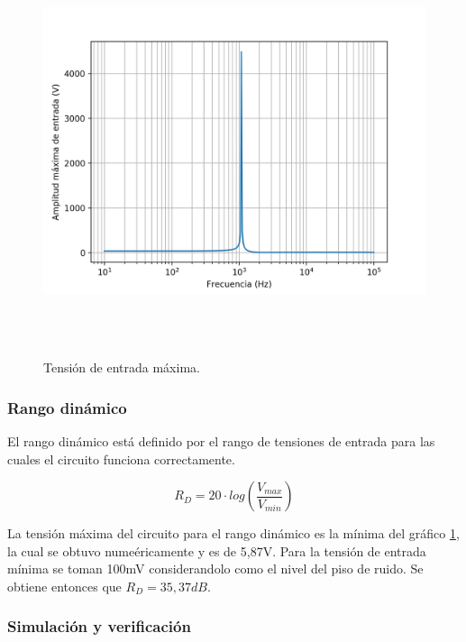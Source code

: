  \begin{figure}[H] %
	\centering	\includegraphics[width=12cm,height=12cm,keepaspectratio]{../EJ4/graficos/vinmax.png}
	\caption{Tensi\'on de entrada m\'axima.}
	\label{vimax}
\end{figure}


\subsubsection*{Rango din\'amico}

El rango din\'amico est\'a definido por el rango de tensiones de entrada para las cuales el circuito funciona correctamente. 

\begin{equation}
R_D = 20 \cdot log\left( \frac{V_{max}}{V_{min}}\right)
\end{equation}

La tensi\'on m\'axima del circuito para el rango din\'amico es la m\'inima del gr\'afico \ref{vimax}, la cual se obtuvo nume\'ericamente y es de 5,87V. Para la tensi\'on de entrada m\'inima se toman 100mV considerandolo como el nivel del piso de ruido. Se obtiene entonces que $R_D=35,37dB$.



\subsubsection{Simulaci\'on y verificaci\'on}

